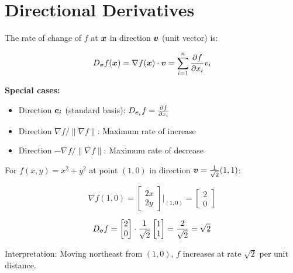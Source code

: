 \section{Directional Derivatives}

\begin{definition}
The rate of change of $f$ at $\bm{x}$ in direction $\bm{v}$ (unit vector) is:

\begin{equation}
    D_{\bm{v}} f(\bm{x}) = \nabla f(\bm{x}) \cdot \bm{v} = \sum_{i=1}^n \frac{\partial f}{\partial x_i} v_i
\end{equation}

\textbf{Special cases:}
\begin{itemize}
    \item Direction $\bm{e}_i$ (standard basis): $D_{\bm{e}_i} f = \frac{\partial f}{\partial x_i}$
    \item Direction $\nabla f / \|\nabla f\|$: Maximum rate of increase
    \item Direction $-\nabla f / \|\nabla f\|$: Maximum rate of decrease
\end{itemize}
\end{definition}

\begin{example}
For $f(x, y) = x^2 + y^2$ at point $(1, 0)$ in direction $\bm{v} = \frac{1}{\sqrt{2}}(1, 1)$:

\begin{equation}
    \nabla f(1, 0) = \begin{bmatrix} 2x \\ 2y \end{bmatrix}\bigg|_{(1,0)} = \begin{bmatrix} 2 \\ 0 \end{bmatrix}
\end{equation}

\begin{equation}
    D_{\bm{v}} f = \begin{bmatrix} 2 \\ 0 \end{bmatrix} \cdot \frac{1}{\sqrt{2}}\begin{bmatrix} 1 \\ 1 \end{bmatrix} = \frac{2}{\sqrt{2}} = \sqrt{2}
\end{equation}

Interpretation: Moving northeast from $(1, 0)$, $f$ increases at rate $\sqrt{2}$ per unit distance.
\end{example}

